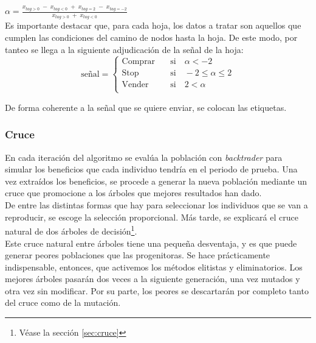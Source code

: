 $\alpha = \frac{x_{tag>0}\; -\; x_{tag<0} \; + \; x_{tag=2} \; -\; x_{tag=-2}}{x_{tag>0}\; + \; x_{tag<0}} $\\


Es importante destacar que, para cada hoja, los datos a tratar son aquellos que cumplen las condiciones del camino de nodos hasta la hoja. De este modo, por tanteo se llega a la siguiente adjudicaci\'on de la se\~nal de la hoja:\\

\[   
\text{se\~nal} = 
     \begin{cases}
       \text{Comprar} &\quad\text{si}\quad \alpha < -2\\
       \text{Stop} &\quad\text{si}\quad -2 \leq \alpha \leq 2\\
       \text{Vender} &\quad\text{si}\quad 2 < \alpha\\ 
     \end{cases}
\]

De forma coherente a la se\~nal que se quiere enviar, se colocan las etiquetas.\\

\subsubsection{Cruce}
En cada iteraci\'on del algoritmo se eval\'ua la poblaci\'on con \textit{backtrader} para simular los beneficios que cada individuo tendr\'ia en el periodo de prueba. Una vez extra\'idos los beneficios, se procede a generar la nueva poblaci\'on mediante un cruce que promocione a los \'arboles que mejores resultados han dado.\\

De entre las distintas formas que hay para seleccionar los individuos que se van a reproducir, se escoge la selecci\'on proporcional. M\'as tarde, se explicar\'a el cruce natural de dos \'arboles de decisi\'on\footnote{V\'ease la secci\'on \ref{sec:cruce}}.\\

Este cruce natural entre \'arboles tiene una peque\~na desventaja, y es que puede generar peores poblaciones que las progenitoras. Se hace pr\'acticamente indispensable, entonces, que activemos los m\'etodos elitistas y eliminatorios. Los mejores \'arboles pasar\'an dos veces a la siguiente generaci\'on, una vez mutados y otra vez sin modificar. Por su parte, los peores se descartar\'an por completo tanto del cruce como de la mutaci\'on.\\

